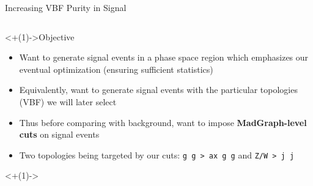 \documentclass[handout]{beamer}
\begin{document}
\begin{frame}{Increasing VBF Purity in Signal}
    \begin{columns}
        \begin{column}{0.45\linewidth}
            \begin{block}<+(1)->{Objective}
                \begin{itemize}[<+(1)->]
                    \item Want to generate signal events in a phase space region which emphasizes our eventual optimization (ensuring sufficient statistics)
                    \item Equivalently, want to generate signal events with the particular topologies (VBF) we will later select
                    \item Thus before comparing with background, want to impose \textbf{MadGraph-level cuts} on signal events
                    \item Two topologies being targeted by our cuts: \texttt{g g > ax g g} and \texttt{Z/W > j j}
                \end{itemize}
            \end{block}
            
            \smallskip
            
            \centering
            \uncover<+(1)->{
                }
\end{column}
\end{columns}
\end{frame}
\end{document}
